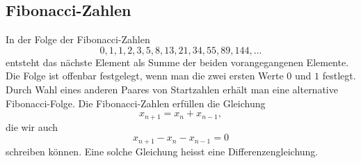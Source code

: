 \subsection{Fibonacci-Zahlen}
In der Folge der Fibonacci-Zahlen
\[
0,1,1,2,3,5,8,13,21,34,55,89,144,\dots
\]
entsteht das nächste Element als Summe der beiden vorangegangenen
Elemente.
Die Folge ist offenbar festgelegt, wenn man die zwei ersten
Werte $0$ und $1$ festlegt.
Durch Wahl eines anderen Paares von Startzahlen
erhält man eine alternative Fibonacci-Folge.
Die Fibonacci-Zahlen
erfüllen die Gleichung
\[
x_{n+1}=x_n+x_{n-1},
\]
die wir
auch
\begin{equation}
x_{n+1}-x_n-x_{n-1}=0
\end{equation}
schreiben können.
Eine solche Gleichung heisst eine Differenzengleichung.

